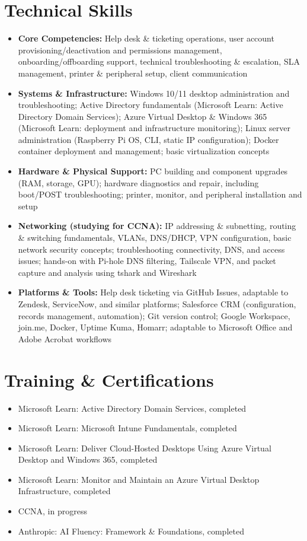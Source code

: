 \documentclass[letterpaper,10.5pt]{article}
\begin{document}
\section*{Technical Skills}
\begin{itemize}
  \item \textbf{Core Competencies:} Help desk \& ticketing operations, user account
        provisioning/deactivation and permissions management, onboarding/offboarding support,
        technical troubleshooting \& escalation, SLA management, printer \& peripheral setup,
        client communication
  \item \textbf{Systems \& Infrastructure:} Windows 10/11 desktop administration and
        troubleshooting; Active Directory fundamentals (Microsoft Learn: Active Directory Domain
        Services); Azure Virtual Desktop \& Windows 365 (Microsoft Learn: deployment and
        infrastructure monitoring); Linux server administration (Raspberry Pi OS, CLI, static IP
        configuration); Docker container deployment and management; basic virtualization concepts
  \item \textbf{Hardware \& Physical Support:} PC building and component upgrades (RAM, storage,
        GPU); hardware diagnostics and repair, including boot/POST troubleshooting; printer,
        monitor, and peripheral installation and setup
  \item \textbf{Networking (studying for CCNA):} IP addressing \& subnetting, routing \& switching
        fundamentals, VLANs, DNS/DHCP, VPN configuration, basic network security concepts;
        troubleshooting connectivity, DNS, and access issues; hands-on with Pi-hole DNS filtering,
        Tailscale VPN, and packet capture and analysis using tshark and Wireshark
  \item \textbf{Platforms \& Tools:} Help desk ticketing via GitHub Issues, adaptable to Zendesk,
        ServiceNow, and similar platforms; Salesforce CRM (configuration, records management,
        automation); Git version control; Google Workspace, join.me, Docker, Uptime Kuma, Homarr;
        adaptable to Microsoft Office and Adobe Acrobat workflows
\end{itemize}

\section*{Training \& Certifications}
\begin{itemize}
  \item Microsoft Learn: Active Directory Domain Services, completed
  \item Microsoft Learn: Microsoft Intune Fundamentals, completed
  \item Microsoft Learn: Deliver Cloud-Hosted Desktops Using Azure Virtual Desktop and
        Windows 365, completed
  \item Microsoft Learn: Monitor and Maintain an Azure Virtual Desktop Infrastructure, completed
  \item CCNA, in progress
  \item Anthropic: AI Fluency: Framework \& Foundations, completed
\end{itemize}
\end{document}
